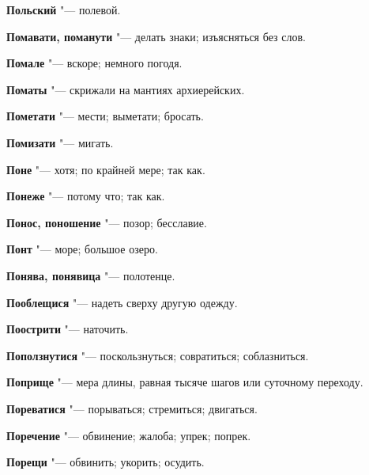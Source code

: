 \begin{mymulticols}{2}
\noindent\textbf{Польский} "--- полевой. 




\noindent\textbf{Помавати, поманути} "--- делать знаки; изъясняться без слов. 




\noindent\textbf{Помале} "--- вскоре; немного погодя. 




\noindent\textbf{Поматы} "--- скрижали на мантиях архиерейских. 




\noindent\textbf{Пометати} "--- мести; выметати; бросать. 




\noindent\textbf{Помизати} "--- мигать. 




\noindent\textbf{Поне} "--- хотя; по крайней мере; так как. 




\noindent\textbf{Понеже} "--- потому что; так как. 




\noindent\textbf{Понос, поношение} "--- позор; бесславие. 




\noindent\textbf{Понт} "--- море; большое озеро. 




\noindent\textbf{Понява, понявица} "--- полотенце. 




\noindent\textbf{Пооблещися} "--- надеть сверху другую одежду. 




\noindent\textbf{Поострити} "--- наточить. 




\noindent\textbf{Поползнутися} "--- поскользнуться; совратиться; соблазниться. 




\noindent\textbf{Поприще} "--- мера длины, равная тысяче шагов или суточному переходу. 




\noindent\textbf{Пореватися} "--- порываться; стремиться; двигаться. 




\noindent\textbf{Поречение} "--- обвинение; жалоба; упрек; попрек. 




\noindent\textbf{Порещи} "--- обвинить; укорить; осудить. 





\end{mymulticols}

